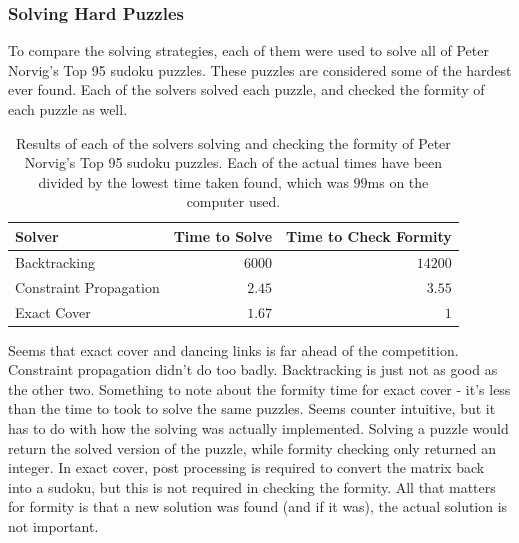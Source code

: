    \subsubsection{Solving Hard Puzzles}
    To compare the solving strategies, each of them were used to solve all of Peter Norvig's Top 95 sudoku puzzles\cite{norvig}.
    These puzzles are considered some of the hardest ever found. Each of the solvers solved each puzzle, and checked the formity
    of each puzzle as well.
    \begin{table}[H]
    \begin{center}\begin{tabular}{l|r|r}
        \hline
        Solver                  &   Time to Solve   &   Time to Check Formity   \\  \hline
        Backtracking            &   $6000$                  &   $14200$         \\
        Constraint Propagation  &   $2.45$                  &   $3.55$          \\
        Exact Cover             &   $1.67$                  &   $1$             \\
        \hline
    \end{tabular}\end{center}
    \caption{Results of each of the solvers solving and checking the formity of Peter Norvig's Top 95 sudoku puzzles. Each of the actual
    times have been divided by the lowest time taken found, which was $99$ms on the computer used.}
    \label{tab:top95}
    \end{table}
    Seems that exact cover and dancing links is far ahead of the competition. Constraint propagation didn't do too badly. Backtracking
    is just not as good as the other two. Something to note about the formity time for exact cover - it's less than the time to took
    to solve the same puzzles. Seems counter intuitive, but it has to do with how the solving was actually implemented. Solving a puzzle
    would return the solved version of the puzzle, while formity checking only returned an integer. In exact cover, post processing is
    required to convert the matrix back into a sudoku, but this is not required in checking the formity. All that matters for formity
    is that a new solution was found (and if it was), the actual solution is not important.
    

